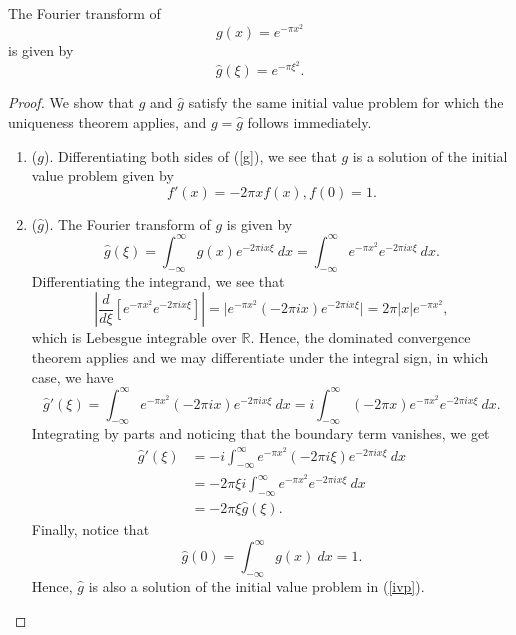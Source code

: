 \documentclass[10pt,a4paper]{amsart}
\begin{document}
\begin{proposition}
    The Fourier transform of 
    \begin{equation}\label{g}
        g(x) = e^{-\pi x^2}
    \end{equation}
    is given by
    \begin{equation}
        \hat{g}(\xi) = e^{-\pi \xi^2}.
    \end{equation}
\end{proposition}

\begin{proof}
    We show that $g$ and $\hat{g}$ satisfy the same initial value problem for which the uniqueness theorem applies, and $g = \hat{g}$ follows immediately.
    \begin{enumerate}
        \item ($g$). Differentiating both sides of (\ref{g}), we see that $g$ is a solution of the initial value problem given by
        \begin{equation}\label{ivp}
            f'(x) = -2\pi x f(x), f(0) = 1.
        \end{equation}
        \item ($\hat{g}$). The Fourier transform of $g$ is given by
        \begin{equation}
            \hat{g}(\xi) = \int_{-\infty}^\infty g(x) e^{-2\pi ix\xi} \ dx = \int_{-\infty}^\infty e^{-\pi x^2} e^{-2\pi ix\xi} \ dx.
        \end{equation}
        Differentiating the integrand, we see that
        \begin{equation}
            \left \vert \frac{d}{d\xi} [e^{-\pi x^2} e^{-2\pi ix\xi}] \right \vert = \vert e^{-\pi x^2} (-2\pi ix) e^{-2\pi ix\xi} \vert = 2\pi \vert x \vert e^{-\pi x^2},
        \end{equation}
         which is Lebesgue integrable over $\mathbb{R}$. Hence, the dominated convergence theorem applies and we may differentiate under the integral sign, in which case, we have
         \begin{equation}
             \hat{g}'(\xi) = \int_{-\infty}^\infty e^{-\pi x^2} (-2\pi ix) e^{-2\pi ix\xi} \ dx = i \int_{-\infty}^\infty (-2\pi x)e^{-\pi x^2} e^{-2\pi ix\xi} \ dx.
         \end{equation}
         Integrating by parts and noticing that the boundary term vanishes, we get 
         \begin{align}
             \hat{g}'(\xi) & = -i \int_{-\infty}^\infty e^{-\pi x^2} (-2\pi i\xi) e^{-2\pi ix\xi} \ dx \\
             & = -2\pi\xi i \int_{-\infty}^\infty e^{-\pi x^2} e^{-2\pi ix\xi} \ dx \\
             & = -2\pi\xi \hat{g}(\xi).
         \end{align}
         Finally, notice that 
         \begin{equation}
             \hat{g}(0) = \int_{-\infty}^\infty g(x) \ dx = 1.
         \end{equation}
         Hence, $\hat{g}$ is also a solution of the initial value problem in (\ref{ivp}).
    \end{enumerate}
\end{proof}
\end{document}
